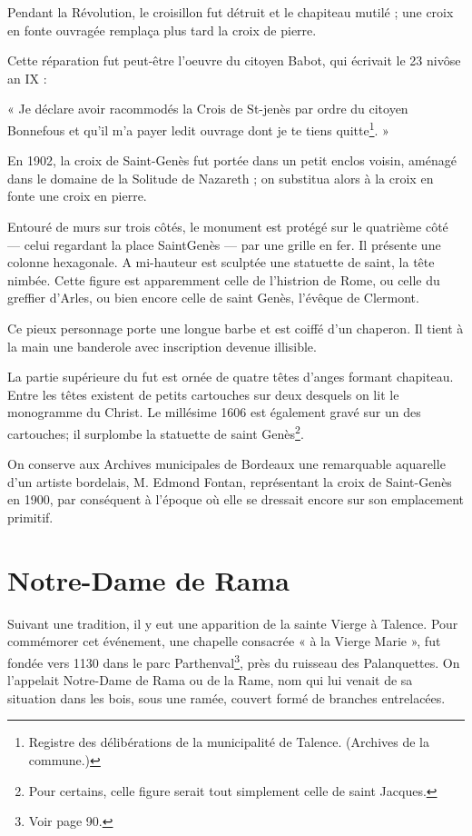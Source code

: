 \documentclass[a4paper,11pt]{book}
\begin{document}
Pendant la Révolution, le croisillon fut détruit et le chapiteau mutilé ; une croix en fonte ouvragée remplaça plus tard la croix de pierre.

Cette réparation fut peut-être l'oeuvre du citoyen Babot, qui écrivait le 23 nivôse an IX : 

« Je déclare avoir racommodés la Crois de St-jenès par ordre du citoyen Bonnefous et qu'il m'a payer ledit ouvrage dont je te tiens quitte\footnote{Registre des délibérations de la municipalité de Talence. (Archives de la commune.)}. »

En 1902, la croix de Saint-Genès fut portée dans un petit enclos voisin, aménagé dans le domaine de la Solitude de Nazareth ; on substitua alors à la croix en fonte une croix en pierre.

Entouré de murs sur trois côtés, le monument est protégé sur le quatrième côté — celui regardant la place SaintGenès — par une grille en fer. Il présente une colonne hexagonale. A mi-hauteur est sculptée une statuette de saint, la tête nimbée. Cette figure est apparemment celle de l'histrion de Rome, ou celle du greffier d'Arles, ou bien encore celle de saint Genès, l'évêque de Clermont.

Ce pieux personnage porte une longue barbe et est coiffé d'un chaperon. Il tient à la main une banderole avec inscription devenue illisible.

La partie supérieure du fut est ornée de quatre têtes d'anges formant chapiteau. Entre les têtes existent de petits cartouches sur deux desquels on lit le monogramme du Christ. Le millésime 1606 est également gravé sur un des cartouches; il surplombe la statuette de saint Genès\footnote{Pour certains, celle figure serait tout simplement celle de saint Jacques.}.

On conserve aux Archives municipales de Bordeaux une remarquable aquarelle d'un artiste bordelais, M. Edmond Fontan, représentant la croix de Saint-Genès en 1900, par conséquent à l'époque où elle se dressait encore sur son emplacement primitif.

\section{Notre-Dame de Rama}

Suivant une tradition, il y eut une apparition de la sainte Vierge à Talence. Pour commémorer cet événement, une chapelle consacrée « à la Vierge Marie », fut fondée vers 1130 dans le parc Parthenval\footnote{Voir page 90.}, près du ruisseau des Palanquettes. On l'appelait Notre-Dame de Rama ou de la Rame, nom qui lui venait de sa situation dans les bois, sous une ramée, couvert formé de branches entrelacées.
\end{document}
